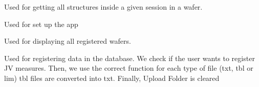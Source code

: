 \documentclass[letterpaper,10pt,english]{sphinxmanual}
\begin{document}

\begin{fulllineitems}
\label{\detokenize{app:app.get_structures_json}}
\pysigstartsignatures
{}
\pysigstopsignatures
\sphinxAtStartPar
Used for getting all structures inside a given session in a wafer.

\end{fulllineitems}


\begin{fulllineitems}
\label{\detokenize{app:app.index}}
\pysigstartsignatures
{}
\pysigstopsignatures
\sphinxAtStartPar
Used for set up the app

\end{fulllineitems}


\begin{fulllineitems}
\label{\detokenize{app:app.open}}
\pysigstartsignatures
{}
\pysigstopsignatures
\sphinxAtStartPar
Used for displaying all registered wafers.

\end{fulllineitems}


\begin{fulllineitems}
\label{\detokenize{app:app.options}}
\pysigstartsignatures
{}
\pysigstopsignatures
\sphinxAtStartPar
Used for registering data in the database. We check if the user wants to register J\sphinxhyphen{}V measures.
Then, we use the correct function for each type of file (txt, tbl or lim)
tbl files are converted into txt.
Finally, Upload Folder is cleared

\end{fulllineitems}
\end{document}
